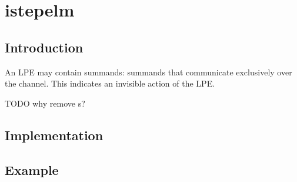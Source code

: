 \chapter{istepelm}

\section{Introduction}

An LPE may contain \istep{} summands: summands that communicate exclusively over the \istep{} channel.
This indicates an invisible action of the LPE.

TODO why remove \istep{}s?

\section{Implementation}

\section{Example}

